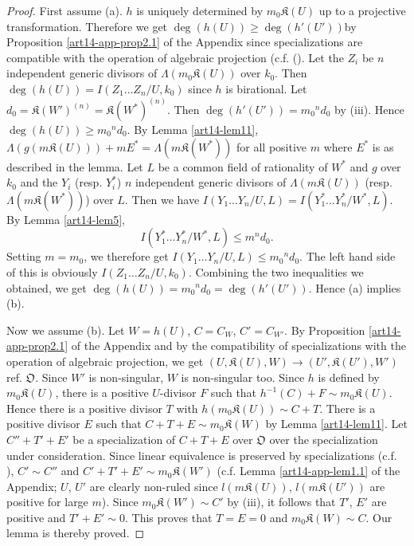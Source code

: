 \begin{proof}
First assume (a). $h$ is uniquely determined by $m_{0}\mathfrak{K}(U)$ up to a projective transformation. Therefore we get $\deg(h(U))\geq \deg (h'(U'))$\pageoriginale by Proposition \ref{art14-app-prop2.1} of the Appendix since specializations are compatible with the operation of algebraic projection (c.f. (\cite{art14-key24}). Let the $Z_{i}$ be $n$ independent generic divisors of $\Lambda(m_{0}\mathfrak{K}(U))$ over $k_{0}$. Then $\deg(h(U))=I(Z_{1}\ldots Z_{n}/U,k_{0})$ since $h$ is birational. Let $d_{0}=\mathfrak{K}(W')^{(n)}=\mathfrak{K}(W^{*})^{(n)}$. Then $\deg(h'(U'))=m_{0}{}^{n}d_{0}$ by (iii). Hence $\deg (h(U))\geq m_{0}{}^{n}d_{0}$. By Lemma \ref{art14-lem11}, $\Lambda (g(m\mathfrak{K}(U)))+mE^{*}=\Lambda(m\mathfrak{K}(W^{*}))$ for all positive $m$ where $E^{*}$ is as described in the lemma. Let $L$ be a common field of rationality of $W^{*}$ and $g$ over $k_{0}$ and the $Y_{i}$ (resp. $Y^{*}_{i}$) $n$ independent generic divisors of $\Lambda(m\mathfrak{K}(U))$ (resp. $\Lambda(m\mathfrak{K}(W^{*}))$) over $L$. Then we have $I(Y_{1}\ldots Y_{n}/U,L)=I(Y^{*}_{1}\ldots Y^{*}_{n}/W^{*},L)$. By Lemma \ref{art14-lem5}, 
$$
I(Y^{*}_{1}\ldots Y^{*}_{n}/W^{*},L)\leq m^{n}d_{0}.
$$ 
Setting $m=m_{0}$, we therefore get $I(Y_{1}\ldots Y_{n}/U,L)\leq m_{0}{}^{n}d_{0}$. The left hand side of this is obviously $I(Z_{1}\ldots Z_{n}/U,k_{0})$. Combining the two inequalities we obtained, we get $\deg(h(U))=m_{0}{}^{n}d_{0}=\deg(h'(U'))$. Hence (a) implies (b).

Now we assume (b). Let $W=h(U)$, $C=C_{W}$, $C'=C_{W'}$. By Proposition \ref{art14-app-prop2.1} of the Appendix and by the compatibility of specializations with the operation of algebraic projection, we get $(U,\mathfrak{K}(U), W)\to (U',\mathfrak{K}(U'),W')$ ref. $\mathfrak{O}$. Since $W'$ is non-singular, $W$ is non-singular too. Since $h$ is defined by $m_{0}\mathfrak{K}(U)$, there is a positive $U$-divisor $F$ such that $h^{-1}(C)+F\sim m_{0}\mathfrak{K}(U)$. Hence there is a positive divisor $T$ with $h(m_{0}\mathfrak{K}(U))\sim C+T$. There is a positive divisor $E$ such that $C+T+E\sim m_{0}\mathfrak{K}(W)$ by Lemma \ref{art14-lem11}. Let $C''+T'+E'$ be a specialization of $C+T+E$ over $\mathfrak{O}$ over the specialization under consideration. Since linear equivalence is preserved by specializations (c.f. \cite{art14-key24}), $C'\sim C''$ and $C'+T'+E'\sim m_{0}\mathfrak{K}(W')$ (c.f. Lemma \ref{art14-app-lem1.1} of the Appendix; $U$, $U'$ are clearly non-ruled since $l(m\mathfrak{K}(U))$, $l(m\mathfrak{K}(U'))$ are positive for large $m$). Since $m_{0}\mathfrak{K}(W')\sim C'$ by (iii), it follows that $T'$, $E'$ are positive and $T'+E'\sim 0$. This proves that $T=E=0$ and $m_{0}\mathfrak{K}(W)\sim C$. Our lemma is thereby proved.
\end{proof}

